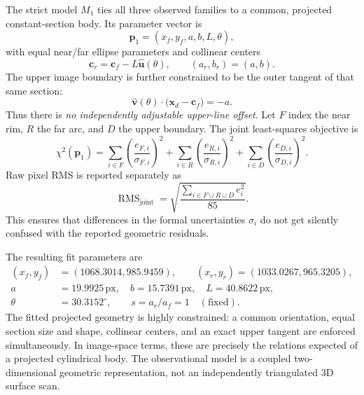 \documentclass[11pt,letterpaper]{article}
\newcommand{\rms}{\operatorname{RMS}}
\newcommand{\px}{\,\mathrm{px}}
\newcommand{\mat}[1]{\mathbf{#1}}
\begin{document}
The strict model \(M_1\) ties all three observed families to a common, projected constant-section body. Its parameter vector is
\begin{equation}
 \mat p_1=(x_f,y_f,a,b,L,\theta),
\end{equation}
with equal near/far ellipse parameters and collinear centers
\begin{equation}
 \mat c_r=\mat c_f-L\hat{\mat u}(\theta),\qquad
 (a_r,b_r)=(a,b).
 \label{eq:axis}
\end{equation}
The upper image boundary is further constrained to be the outer tangent of that same section:
\begin{equation}
 \hat{\mat v}(\theta)\cdot\bigl(\mat x_d-\mat c_f\bigr)=-a.
 \label{eq:tangent}
\end{equation}
Thus there is \emph{no independently adjustable upper-line offset}. Let \(F\) index the near rim, \(R\) the far arc, and \(D\) the upper boundary. The joint least-squares objective is
\begin{equation}
 \chi^2(\mat p_1)=\sum_{i\in F}\left(\frac{e_{F,i}}{\sigma_{F,i}}\right)^2
 +\sum_{i\in R}\left(\frac{e_{R,i}}{\sigma_{R,i}}\right)^2
 +\sum_{i\in D}\left(\frac{e_{D,i}}{\sigma_{D,i}}\right)^2.
 \label{eq:loss}
\end{equation}
Raw pixel RMS is reported separately as
\begin{equation}
 \rms_{\mathrm{joint}}=\sqrt{\frac{\sum_{i\in F\cup R\cup D}e_i^2}{85}}.
 \label{eq:rms}
\end{equation}
This ensures that differences in the formal uncertainties \(\sigma_i\) do not get silently confused with the reported geometric residuals.

The resulting fit parameters are
\begin{equation}
\begin{aligned}
 (x_f,y_f)&=(1068.3014,985.9459),\qquad
 (x_r,y_r)=(1033.0267,965.3205),\\
 a&=19.9925\px,\quad b=15.7391\px,\quad
 L=40.8622\px,\\
 \theta&=30.3152^\circ,\qquad s=a_r/a_f=1\quad(\text{fixed}).
\end{aligned}
\end{equation}
The fitted projected geometry is highly constrained: a common orientation, equal section size and shape, collinear centers, and an exact upper tangent are enforced simultaneously. In image-space terms, these are precisely the relations expected of a projected cylindrical body. The observational model is a coupled two-dimensional geometric representation, not an independently triangulated 3D surface scan.
\end{document}
